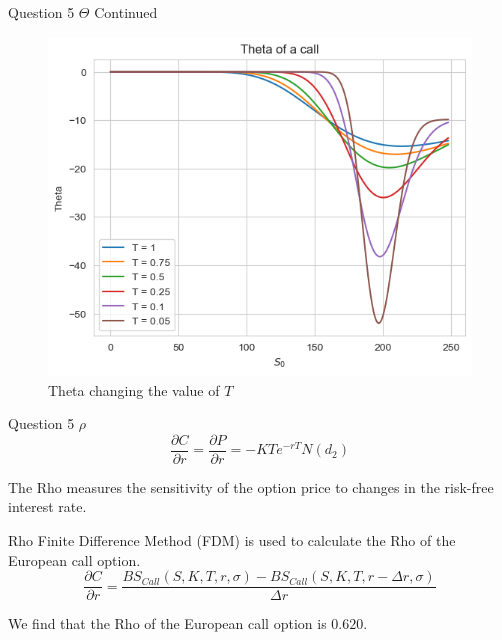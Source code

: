 \documentclass[compress,12pt]{beamer}
\begin{document}
\begin{frame}{Question 5 $\Theta$ Continued}
      \begin{figure}
            \centering
            \includegraphics[scale=0.6]{./imgs/theta.png}
            \caption{Theta changing the value of $T$}
      \end{figure}

\end{frame}

\begin{frame}{Question 5 $\rho$}
      \begin{equation*}
            \frac{\partial {C}}{\partial r} =\frac{\partial {P}}{\partial r}=-KTe^{-rT}N(d_2)
      \end{equation*}

      The Rho measures the sensitivity of the option price to changes in the risk-free interest rate.

      Rho Finite Difference Method (FDM) is used to calculate the Rho of the European call option.
      \tiny{
            \begin{equation*}
                  \frac{\partial C}{\partial r} = \frac{BS_{Call}(S, K, T,r,\sigma) - BS_{Call}(S , K, T,r-\Delta r,\sigma)}{\Delta r}
            \end{equation*}
      }
      \normalsize
      \begin{tcolorbox}
            We find that the Rho of the European call option is $\boxed{0.620}$.
      \end{tcolorbox}
\end{frame}
\end{document}
